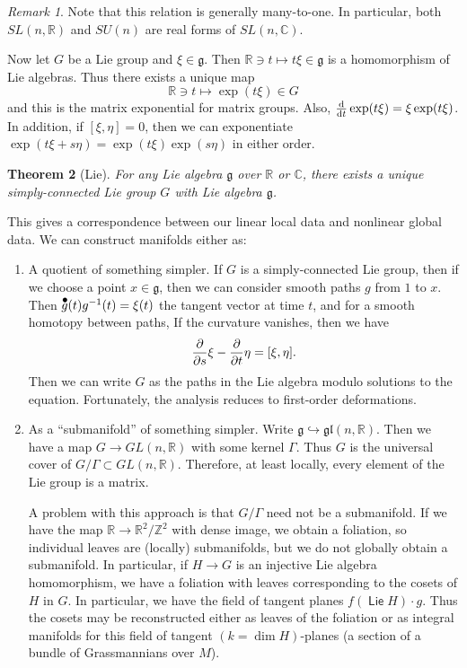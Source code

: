 \documentclass[leqno, openany]{memoir}
\newtheorem{thm}{Theorem}[section]
\theoremstyle{definition}
\theoremstyle{remark}
\newtheorem{rmk}[thm]{Remark}
\theoremstyle{plain}
\theoremstyle{definition}
\theoremstyle{remark}
\newcommand{\R}{\mathbb{R}}
\newcommand{\C}{\mathbb{C}}
\newcommand{\Z}{\mathbb{Z}}
\newcommand*{\dt}[1]{%
   \accentset{\mbox{\Huge\bfseries .}}{#1}}
\newcommand{\mf}[1]{\mathfrak{#1}}
\DeclareMathOperator{\Lie}{\mathsf{Lie}}
\begin{document}
\begin{rmk}
    Note that this relation is generally many-to-one. In particular, both $SL(n, \R)$ and $SU(n)$ are real forms of $SL(n, \C)$.
\end{rmk}

Now let $G$ be a Lie group and $\xi \in \mf{g}$. Then $\R \ni t \mapsto t \xi \in \mf{g}$ is a homomorphism of Lie algebras. Thus there exists a unique map
\[ \R \ni t \mapsto \exp(t \xi) \in G \]
and this is the matrix exponential for matrix groups. Also, $\dv{t} \exp(t \xi) = \xi \exp(t \xi)$. In addition, if $[\xi, \eta] = 0$, then we can exponentiate $\exp(t \xi + s \eta) = \exp(t \xi) \exp(s \eta)$ in either order.

\begin{thm}[Lie]
    For any Lie algebra $\mf{g}$ over $\R$ or $\C$, there exists a unique simply-connected Lie group $G$ with Lie algebra $\mf{g}$.
\end{thm}

This gives a correspondence between our linear local data and nonlinear global data. We can construct manifolds either as:
\begin{enumerate}
    \item A quotient of something simpler. If $G$ is a simply-connected Lie group, then if we choose a point $x \in \mf{g}$, then we can consider smooth paths $g$ from $1$ to $x$. Then $\dt{g}(t) g^{-1}(t) = \xi(t)$ the tangent vector at time $t$, and for a smooth homotopy between paths, If the curvature vanishes, then we have
        \[ \pdv{s} \xi - \pdv{t} \eta = [\xi, \eta]. \]
        Then we can write $G$ as the paths in the Lie algebra modulo solutions to the equation. Fortunately, the analysis reduces to first-order deformations.
    \item As a ``submanifold'' of something simpler. Write $\mf{g} \hookrightarrow \mf{gl}(n, \R)$. Then we have a map $G \to GL(n, \R)$ with some kernel $\Gamma$. Thus $G$ is the universal cover of $G/\Gamma \subset GL(n, \R)$. Therefore, at least locally, every element of the Lie group is a matrix.

        A problem with this approach is that $G/\Gamma$ need not be a submanifold. If we have the map $\R \to \R^2 / \Z^2$ with dense image, we obtain a foliation, so individual leaves are (locally) submanifolds, but we do not globally obtain a submanifold. In particular, if $H \to G$ is an injective Lie algebra homomorphism, we have a foliation with leaves corresponding to the cosets of $H$ in $G$. In particular, we have the field of tangent planes $f(\Lie H) \cdot g$. Thus the cosets may be reconstructed either as leaves of the foliation or as integral manifolds for this field of tangent $(k=\dim H)$-planes (a section of a bundle of Grassmannians over $M$).
\end{enumerate}
\end{document}
